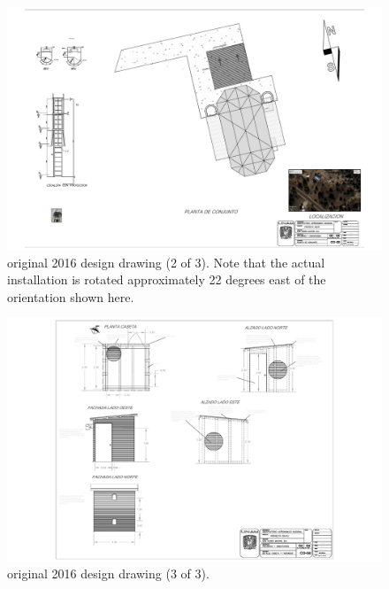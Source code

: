 \begin{figure}
\begin{center}
\includegraphics[height=0.8\linewidth,angle=90]{figures/buildings-ddoti-drawing-2016-2.pdf}
\end{center}
\caption{{\projectname} original 2016 design drawing (2 of 3). Note that the actual installation is rotated approximately 22 degrees east of the orientation shown here.}
\label{figure:buildings-drawing-2016-2}
\end{figure}

\begin{figure}
\begin{center}
\includegraphics[height=0.95\linewidth,angle=90]{figures/buildings-ddoti-drawing-2016-3.pdf}
\end{center}
\caption{{\projectname} original 2016 design drawing (3 of 3).}
\label{figure:buildings-drawing-2016-3}
\end{figure}

